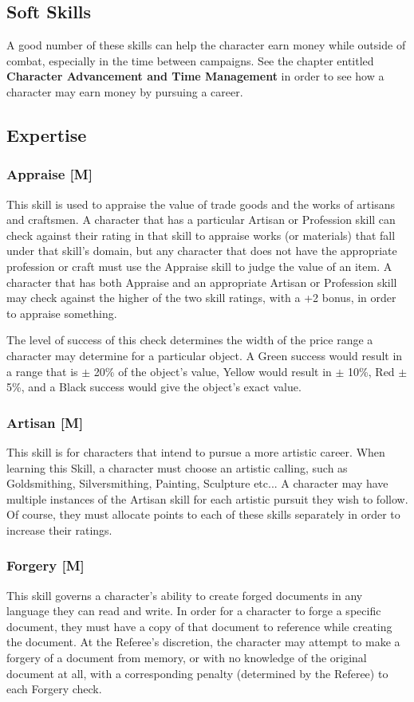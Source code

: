 \documentclass[oneside]{book}
\begin{document}
\begin{multicols}{2}
\section{Soft Skills}

A good number of these skills can help the character earn money while outside of combat, especially in the time between campaigns. See the chapter entitled \textbf{Character Advancement and Time Management} in order to see how a character may earn money by pursuing a career. 
\subsection{Expertise}
\subsubsection{Appraise [M]}
This skill is used to appraise the value of trade goods and the works of artisans and craftsmen. A character that has a particular Artisan or Profession skill can check against their rating in that skill to appraise works (or materials) that fall under that skill's domain, but any character that does not have the appropriate profession or craft must use the Appraise skill to judge the value of an item. A character that has both Appraise and an appropriate Artisan or Profession skill may check against the higher of the two skill ratings, with a +2 bonus, in order to appraise something. 

The level of success of this check determines the width of the price range a character may determine for a particular object. A Green success would result in a range that is $\pm$ 20\% of the object's value, Yellow would result in $\pm$ 10\%, Red $\pm$ 5\%, and a Black success would give the object's exact value.

\subsubsection{Artisan [M]}
This skill is for characters that intend to pursue a more artistic career. When learning this Skill, a character must choose an artistic calling, such as Goldsmithing, Silversmithing, Painting, Sculpture etc... A character may have multiple instances of the Artisan skill for each artistic pursuit they wish to follow. Of course, they must allocate points to each of these skills separately in order to increase their ratings. 

\subsubsection{Forgery [M]}
This skill governs a character's ability to create forged documents in any language they can read and write. In order for a character to forge a specific document, they must have a copy of that document to reference while creating the document. At the Referee's discretion, the character may attempt to make a forgery of a document from memory, or with no knowledge of the original document at all, with a corresponding penalty (determined by the Referee) to each Forgery check.


\end{multicols}
\end{document}
